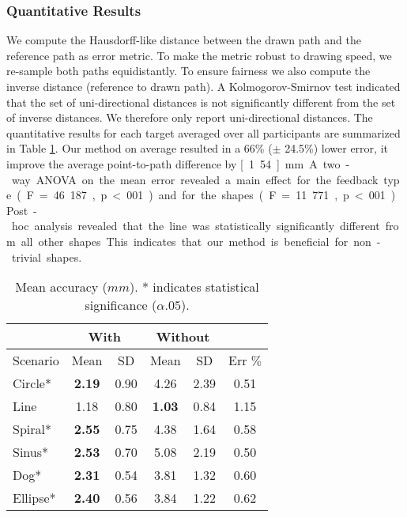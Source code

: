 \subsubsection*{Quantitative Results}
\label{sc:quantitative_results}
We compute the Hausdorff-like distance \cite{rockafellar2009variational} between the drawn path and the reference path as error metric. 
To make the metric robust to drawing speed, we re-sample both paths equidistantly.
To ensure fairness we also compute the inverse distance (reference to drawn path). 
A Kolmogorov-Smirnov test \cite{kolmogorov1933sulla} indicated that the set of uni-directional distances is not significantly different from the set of inverse distances.
We therefore only report uni-directional distances. 
% 
The quantitative results for each target averaged over all participants are summarized in Table \ref{tab:accuracy}.
Our method on average resulted in a 66\% ($\pm$ 24.5\%) lower error, \ie it improve the average point-to-path difference by \unit[1.54]{mm}.
A two-way ANOVA on the mean error revealed a main effect for the feedback type (F=46.187, p<.001) and for the shapes (F=11.771, p < .001). 
Post-hoc analysis revealed that the line was statistically significantly different from all other shapes.
This indicates that our method is beneficial for non-trivial shapes.

\begin{table}[!t]
\caption{Mean accuracy ($mm$). * indicates statistical significance ($\alpha .05$).}
\vspace{.5em}
    \begin{tabular}{l|cc|cc|c}
    \multicolumn{1}{c}{} &\multicolumn{2}{c}{With}&\multicolumn{2}{c}{Without}&\multicolumn{1}{c}{}\\
    \midrule
Scenario& Mean & SD & Mean & SD & Err $\%$ \\
 \midrule
 Circle* & \textbf{2.19} & 0.90 & 4.26 & 2.39 & 0.51 \\
 Line  & 1.18 & 0.80 & \textbf{1.03} & 0.84 & 1.15  \\
 Spiral* & \textbf{2.55} & 0.75 & 4.38 & 1.64 & 0.58  \\
 Sinus*  & \textbf{2.53} & 0.70 & 5.08 & 2.19 & 0.50  \\
 Dog*  & \textbf{2.31} & 0.54 & 3.81 & 1.32 & 0.60 \\
 Ellipse*  & \textbf{2.40} & 0.56 & 3.84 & 1.22 & 0.62 \\
\end{tabular}
\label{tab:accuracy}
\end{table}

